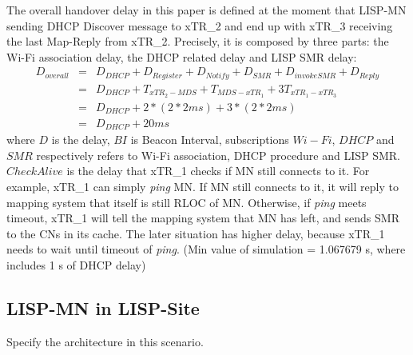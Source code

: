 The overall handover delay in this paper is defined at the moment that LISP-MN sending DHCP Discover message to xTR\_2 and end up with xTR\_3 receiving the last Map-Reply from xTR\_2. Precisely, it is composed by three parts: the Wi-Fi association delay, the DHCP related delay and LISP SMR delay:
\begin{eqnarray}
D_{overall} &=& D_{DHCP} + D_{Register} + D_{Notify} + D_{SMR} + D_{invokeSMR} + D_{Reply} \nonumber \\
&=& D_{DHCP} +T_{xTR_2-MDS} + T_{MDS-xTR_1} + 3T_{xTR_1-xTR_3} \nonumber \\
&=& D_{DHCP} +2* (2*2ms) + 3*(2*2ms) \nonumber \\
&=& D_{DHCP} + 20 ms
\end{eqnarray}
where $D$ is the delay, $BI$ is Beacon Interval, subscriptions $Wi-Fi$, $DHCP$ and $SMR$ respectively refers to Wi-Fi association, DHCP procedure and LISP SMR. $CheckAlive$ is the delay that xTR\_1 checks if MN still connects to it. For example, xTR\_1 can simply \emph{ping} MN. If MN still connects to it, it will reply to mapping system that itself is still RLOC of MN. Otherwise, if \emph{ping} meets timeout, xTR\_1 will tell the mapping system that MN has left, and sends SMR to the CNs in its cache. The later situation has higher delay, because xTR\_1 needs to wait until timeout of \emph{ping}. (Min value of simulation = 1.067679 s, where includes 1 s of DHCP delay)



\subsection{LISP-MN in LISP-Site}
\label{sec:ns3_analysis_lispmn_xTR}
Specify the architecture in this scenario.



